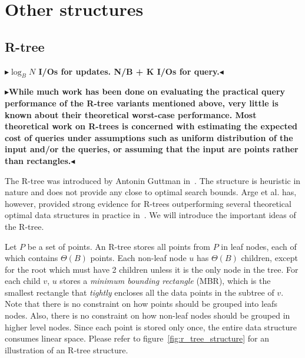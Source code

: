 \documentclass[twoside,11pt,openright]{report}
\newcommand{\todo}[1]{{\color[rgb]{.5,0,0}\textbf{$\blacktriangleright$#1$\blacktriangleleft$}}}
\begin{document}
\chapter{Other structures}
\label{chp:other_structures}
\section{R-tree}

\todo{$\log_B N$ I/Os for updates. N/B + K I/Os for query.}

\todo{While much work has been done on evaluating the practical
query performance of the R-tree variants mentioned
above, very little is known about their theoretical worst-case
performance. Most theoretical work on R-trees is concerned
with estimating the expected cost of queries under assumptions
such as uniform distribution of the input and/or the
queries, or assuming that the input are points rather than
rectangles.}

The R-tree was introduced by Antonin Guttman in~\cite{Guttman:1984:RDI:602259.602266}. The structure is heuristic in nature and does not provide any close to optimal search bounds. Arge et al. has, however, provided strong evidence for R-trees outperforming several theoretical optimal data structures in practice in~\cite{Arge:2008:PRP:1328911.1328920}. We will introduce the important ideas of the R-tree.

Let $P$ be a set of points. An R-tree stores all points from $P$ in leaf nodes, each of which contains $\Theta(B)$ points. Each non-leaf node $u$ has $\Theta(B)$ children, except for the root which must have 2 children unless it is the only node in the tree. For each child $v$, $u$ stores a \textit{minimum bounding rectangle} (MBR), which is the smallest rectangle that \textit{tightly} encloses all the data points in the subtree of $v$. Note that there is no constraint on how points should be grouped into leafs nodes. Also, there is no constraint on how non-leaf nodes should be grouped in higher level nodes. Since each point is stored only once, the entire data structure consumes linear space. Please refer to figure~\ref{fig:r_tree_structure} for an illustration of an R-tree structure.
\end{document}
